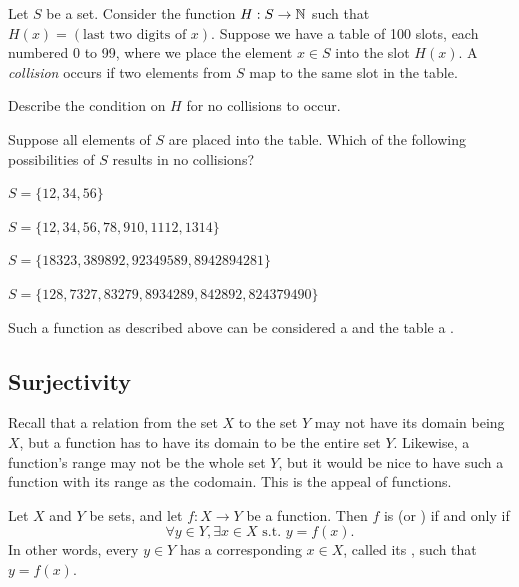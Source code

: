 \begin{exercise}
    Let $S$ be a set. Consider the function $H: S \to \mathbb{N}$ such that $H(x) = (\text{last two digits of } x)$. Suppose we have a table of 100 slots, each numbered 0 to 99, where we place the element $x \in S$ into the slot $H(x)$. A \textit{collision} occurs if two elements from $S$ map to the same slot in the table.

    \begin{partquestions}{\roman*}
        \item Describe the condition on $H$ for no collisions to occur.
        \item Suppose all elements of $S$ are placed into the table. Which of the following possibilities of $S$ results in no collisions?
        \begin{partquestions}{\alph*}
            \item $S = \{12, 34, 56\}$
            \item $S = \{12, 34, 56, 78, 910, 1112, 1314\}$
            \item $S = \{18323, 389892, 92349589, 8942894281\}$
            \item $S = \{128, 7327, 83279, 8934289, 842892, 824379490\}$
        \end{partquestions}
    \end{partquestions}
\end{exercise}
\begin{remark}
    Such a function as described above can be considered a  and the table a .
\end{remark}

\subsection{Surjectivity}
Recall that a relation from the set $X$ to the set $Y$ may not have its domain being $X$, but a function has to have its domain to be the entire set $Y$. Likewise, a function's range may not be the whole set $Y$, but it would be nice to have such a function with its range as the codomain. This is the appeal of  functions.

\begin{definition}[Surjectivity]
    Let $X$ and $Y$ be sets, and let $f: X \to Y$ be a function. Then $f$ is  (or ) if and only if
    \[
        \forall y \in Y, \exists x \in X \text{ s.t. } y = f(x).
    \]
    In other words, every $y \in Y$ has a corresponding $x \in X$, called its , such that $y = f(x)$.
\end{definition}

